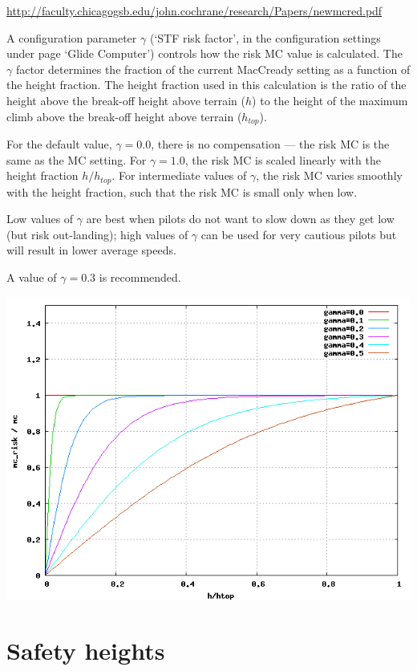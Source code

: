 \documentclass[a4paper,12pt]{refrep}
\begin{document}
\url{http://faculty.chicagogsb.edu/john.cochrane/research/Papers/newmcred.pdf}

  A configuration parameter $\gamma$ (`STF risk factor', in the
  configuration settings under page `Glide Computer') controls how the
  risk MC value is calculated.  The $\gamma$ factor determines the
  fraction of the current MacCready setting as a function of the
  height fraction.  The height fraction used in this calculation is
  the ratio of the height above the break-off height above terrain
  ($h$) to the height of the maximum climb above the break-off height
  above terrain ($h_{top}$).

  For the default value, $\gamma=0.0$, there is no compensation ---
  the risk MC is the same as the MC setting.  For $\gamma=1.0$, the
  risk MC is scaled linearly with the height fraction $h/h_{top}$.
  For intermediate values of $\gamma$, the risk MC varies smoothly
  with the height fraction, such that the risk MC is small only when
  low.

  Low values of $\gamma$ are best when pilots do not want to slow down
  as they get low (but risk out-landing); high values of $\gamma$ can
  be used for very cautious pilots but will result in lower average
  speeds.

  A value of $\gamma=0.3$ is recommended.

\begin{center}
\includegraphics[angle=0,width=\linewidth,keepaspectratio='true']{figures/riskmc.png}
\end{center}

\section{Safety heights}\label{sec:safety-heights}
\end{document}
